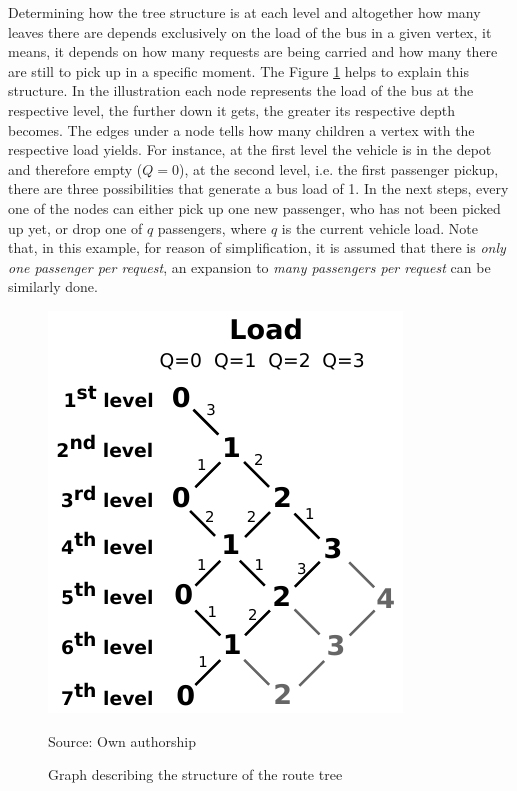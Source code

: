 \documentclass[tuberlin,cic,tc,openright,english,noabntcite,oneside]{iiufrgs}
\begin{document}
Determining how the tree structure is at each level and altogether how many leaves there are depends exclusively on the load of the bus in a given vertex, it means, it depends on how many requests are being carried and how many there are still to pick up in a specific moment. The Figure \ref{fig:load_bus_scheme} helps to explain this structure. In the illustration each node represents the load of the bus at the respective level, the further down it gets, the greater its respective depth becomes. The edges under a node tells how many children a vertex with the respective load yields. For instance, at the first level the vehicle is in the depot and therefore empty ($Q=0$), at the second level, i.e. the first passenger pickup, there are three possibilities that generate a bus load of 1. In the next steps, every one of the nodes can either pick up one new passenger, who has not been picked up yet, or drop one of $q$ passengers, where $q$ is the current vehicle load. Note that, in this example, for reason of simplification, it is assumed that there is \emph{only one passenger per request}, an expansion to \emph{many passengers per request} can be similarly done.
\begin{figure}[H]
	\centering
    \caption{Graph describing the structure of the route tree}
    \includegraphics{fig_load_bus_scheme}\par
	Source: Own authorship
    \label{fig:load_bus_scheme}
\end{figure}
\end{document}
